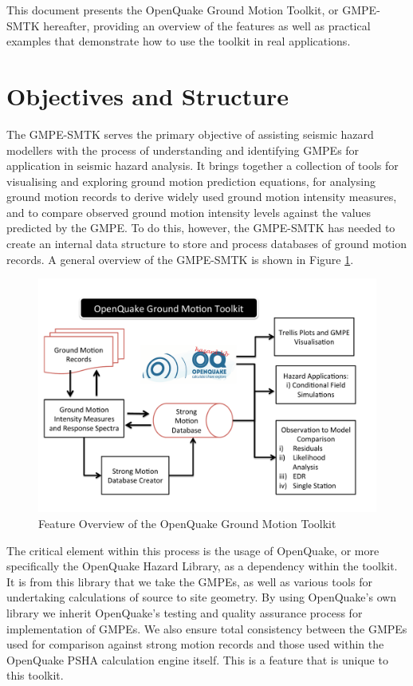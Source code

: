 This document presents the OpenQuake Ground Motion Toolkit, or GMPE-SMTK hereafter, providing an overview of the features as well as practical examples that demonstrate how to use the toolkit in real applications. 

\section{Objectives and Structure}
\label{sec:objectives}

The GMPE-SMTK serves the primary objective of assisting seismic hazard modellers with the process of understanding and identifying GMPEs for application in seismic hazard analysis. It brings together a collection of tools for visualising and exploring ground motion prediction equations, for analysing ground motion records to derive widely used ground motion intensity measures, and to compare observed ground motion intensity levels against the values predicted by the GMPE. To do this, however, the GMPE-SMTK has needed to create an internal data structure to store and process databases of ground motion records. A general overview of the GMPE-SMTK is shown in Figure \ref{fig:smtk_overview}.

\begin{figure}[htb]
	\centering
		\includegraphics[width=\textwidth]{./figures/intro/smtk_architecture_flowchart.pdf}
	\caption{Feature Overview of the OpenQuake Ground Motion Toolkit}
	\label{fig:smtk_overview}
\end{figure}

The critical element within this process is the usage of OpenQuake, or more specifically the OpenQuake Hazard Library, as a dependency within the toolkit. It is from this library that we take the GMPEs, as well as various tools for undertaking calculations of source to site geometry. By using OpenQuake's own library we inherit OpenQuake's testing and quality assurance process for implementation of GMPEs. We also ensure total consistency between the GMPEs used for comparison against strong motion records and those used within the OpenQuake PSHA calculation engine itself. This is a feature that is unique to this toolkit. 

